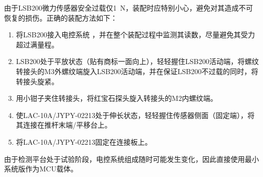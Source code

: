 由于LSB200微力传感器安全过载仅\SI{1}{\newton}，装配时应特别小心，避免对其造成不可恢复的损伤。正确的装配方法如下：

\begin{enumerate}
  \item
    将LSB200接入电控系统
    ，并在整个装配过程中监测其读数，尽量避免其受力超过满量程。
  \item
    LSB200处于平放状态（贴有商标一面向上），轻轻握住LSB200活动端，将螺纹转接头的M3外螺纹端旋入LSB200活动端，并在保证LSB200不过载的同时，将转接头旋紧。
  \item
    用小钳子夹住转接头，将红宝石探头旋入转接头的M2内螺纹端。
  \item
    使LAC-10A/JYPY-02213处于伸长状态，轻轻握住传感器侧面（固定端），将其连接在推杆末端/平移台上。
  \item
    将LAC-10A/JYPY-02213固定在连接板上。
\end{enumerate}


由于检测平台处于试验阶段，电控系统组成随时可能发生变化，因此直接使用最小系统版作为MCU载体。